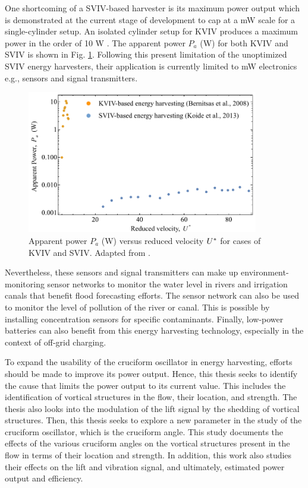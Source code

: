 \documentclass[oneside]{utmthesis}
\begin{document}
One shortcoming of a SVIV-based harvester is its maximum power output which is demonstrated at the current stage of development to cap at a mW scale for a single-cylinder setup. An isolated cylinder setup for KVIV produces a maximum power in the order of 10 W \citep{Bernitsas2009}. The apparent power $P_a$ (W) for both KVIV and SVIV is shown in Fig. \ref{fig:apparentPowerKoide}. Following this present limitation of the unoptimized SVIV energy harvesters, their application is currently limited to mW electronics e.g., sensors and signal transmitters.

\begin{figure}[!h]
  \centering
  \includegraphics[width=0.9\textwidth]{figs/apparentPowerKoide}
  \caption{Apparent power $P_a $ (W) versus reduced velocity $U^{*}$ for cases of KVIV and SVIV. Adapted from \citet{Koide2013}.}
  \label{fig:apparentPowerKoide}
\end{figure}

Nevertheless, these sensors and signal transmitters can make up environment-monitoring sensor networks to monitor the water level in rivers and irrigation canals that benefit flood forecasting efforts. The sensor network can also be used to monitor the level of pollution of the river or canal. This is possible by installing concentration sensors for specific contaminants. Finally, low-power batteries can also benefit from this energy harvesting technology, especially in the context of off-grid charging.

 To expand the usability of the cruciform oscillator in energy harvesting, efforts should be made to improve its power output. Hence, this thesis seeks to identify the cause that limits the power output to its current value. This includes the identification of vortical structures in the flow, their location, and strength. The thesis also looks into the modulation of the lift signal by the shedding of vortical structures. Then, this thesis seeks to explore a new parameter in the study of the cruciform oscillator, which is the cruciform angle. This study documents the effects of the various cruciform angles on the vortical structures present in the flow in terms of their location and strength. In addition, this work also studies their effects on the lift and vibration signal, and ultimately, estimated power output and efficiency.
\end{document}
